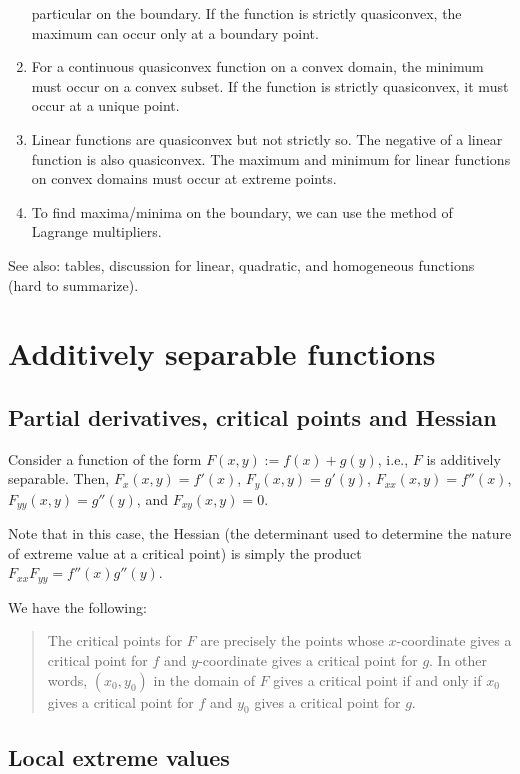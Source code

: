 \documentclass[10pt]{amsart}
\begin{document}
\begin{enumerate}
  particular on the boundary. If the function is strictly quasiconvex,
  the maximum can occur only at a boundary point.
\item For a continuous quasiconvex function on a convex domain, the
  minimum must occur on a convex subset. If the function is strictly
  quasiconvex, it must occur at a unique point.
\item Linear functions are quasiconvex but not strictly so. The
  negative of a linear function is also quasiconvex. The maximum and
  minimum for linear functions on convex domains must occur at extreme
  points.
\item To find maxima/minima on the boundary, we can use the method of
  Lagrange multipliers.
\end{enumerate}

See also: tables, discussion for linear, quadratic, and homogeneous
functions (hard to summarize).

\section{Additively separable functions}

\subsection{Partial derivatives, critical points and Hessian}

Consider a function of the form $F(x,y) := f(x) + g(y)$, i.e., $F$ is
additively separable. Then, $F_x(x,y) = f'(x)$, $F_y(x,y) = g'(y)$,
$F_{xx}(x,y) = f''(x)$, $F_{yy}(x,y) = g''(y)$, and $F_{xy}(x,y) = 0$.

Note that in this case, the Hessian (the determinant used to determine
the nature of extreme value at a critical point) is simply the product
$F_{xx}F_{yy} = f''(x)g''(y)$.

We have the following:

\begin{quote}
  The critical points for $F$ are precisely the points whose
  $x$-coordinate gives a critical point for $f$ and $y$-coordinate
  gives a critical point for $g$. In other words, $(x_0,y_0)$ in the
  domain of $F$ gives a critical point if and only if $x_0$ gives a
  critical point for $f$ and $y_0$ gives a critical point for $g$.
\end{quote}

\subsection{Local extreme values}
\end{document}
